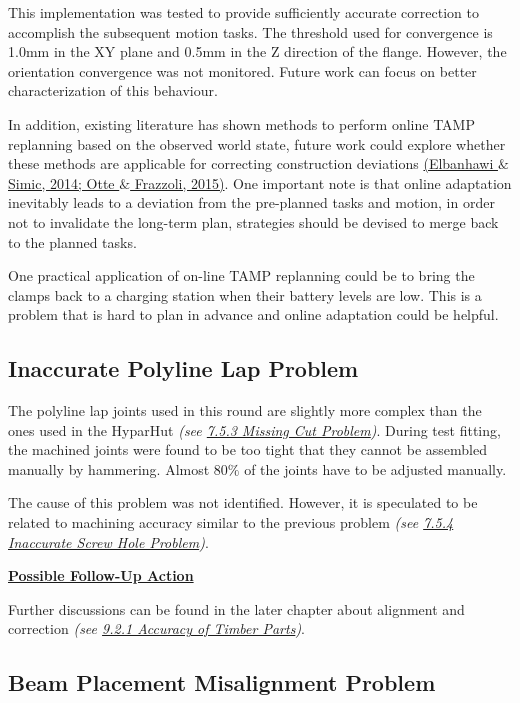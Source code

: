 
This implementation was tested to provide sufficiently accurate correction to accomplish the subsequent motion tasks. The threshold used for convergence is 1.0mm in the XY plane and 0.5mm in the Z direction of the flange. However, the orientation convergence was not monitored. Future work can focus on better characterization of this behaviour. 

In addition, existing literature has shown methods to perform online TAMP replanning based on the observed world state, future work could explore whether these methods are applicable for correcting construction deviations \href{https://www.zotero.org/google-docs/?D9mSau}{(Elbanhawi $\&$ Simic, 2014; Otte $\&$ Frazzoli, 2015)}. One important note is that online adaptation inevitably leads to a deviation from the pre-planned tasks and motion, in order not to invalidate the long-term plan, strategies should be devised to merge back to the planned tasks.

One practical application of on-line TAMP replanning could be to bring the clamps back to a charging station when their battery levels are low. This is a problem that is hard to plan in advance and online adaptation could be helpful. 

\subsection{Inaccurate Polyline Lap Problem}

The polyline lap joints used in this round are slightly more complex than the ones used in the HyparHut \textit{(see \uline{7.5.3 Missing Cut Problem})}. During test fitting, the machined joints were found to be too tight that they cannot be assembled manually by hammering. Almost 80$\%$ of the joints have to be adjusted manually. 

The cause of this problem was not identified. However, it is speculated to be related to machining accuracy similar to the previous problem \textit{(see \uline{7.5.4 Inaccurate Screw Hole Problem})}.

\textbf{\uline{Possible Follow-Up Action}}

Further discussions can be found in the later chapter about alignment and correction \textit{(see \uline{9.2.1 Accuracy of Timber Parts})}.

\subsection{Beam Placement Misalignment Problem}

